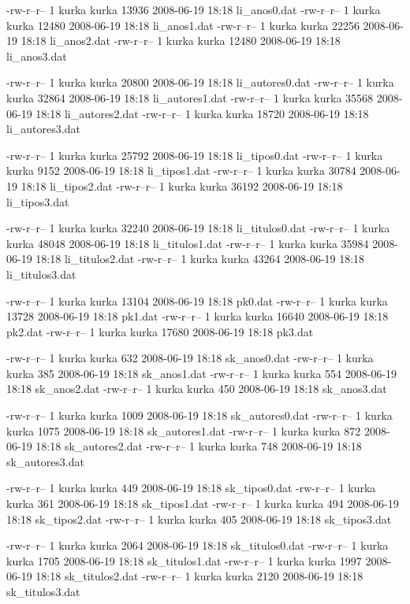 \documentclass{article}
\begin{document}
-rw-r--r-- 1 kurka kurka  13936 2008-06-19 18:18 li_anos0.dat
-rw-r--r-- 1 kurka kurka  12480 2008-06-19 18:18 li_anos1.dat
-rw-r--r-- 1 kurka kurka  22256 2008-06-19 18:18 li_anos2.dat
-rw-r--r-- 1 kurka kurka  12480 2008-06-19 18:18 li_anos3.dat

-rw-r--r-- 1 kurka kurka  20800 2008-06-19 18:18 li_autores0.dat
-rw-r--r-- 1 kurka kurka  32864 2008-06-19 18:18 li_autores1.dat
-rw-r--r-- 1 kurka kurka  35568 2008-06-19 18:18 li_autores2.dat
-rw-r--r-- 1 kurka kurka  18720 2008-06-19 18:18 li_autores3.dat

-rw-r--r-- 1 kurka kurka  25792 2008-06-19 18:18 li_tipos0.dat
-rw-r--r-- 1 kurka kurka   9152 2008-06-19 18:18 li_tipos1.dat
-rw-r--r-- 1 kurka kurka  30784 2008-06-19 18:18 li_tipos2.dat
-rw-r--r-- 1 kurka kurka  36192 2008-06-19 18:18 li_tipos3.dat

-rw-r--r-- 1 kurka kurka  32240 2008-06-19 18:18 li_titulos0.dat
-rw-r--r-- 1 kurka kurka  48048 2008-06-19 18:18 li_titulos1.dat
-rw-r--r-- 1 kurka kurka  35984 2008-06-19 18:18 li_titulos2.dat
-rw-r--r-- 1 kurka kurka  43264 2008-06-19 18:18 li_titulos3.dat

-rw-r--r-- 1 kurka kurka  13104 2008-06-19 18:18 pk0.dat
-rw-r--r-- 1 kurka kurka  13728 2008-06-19 18:18 pk1.dat
-rw-r--r-- 1 kurka kurka  16640 2008-06-19 18:18 pk2.dat
-rw-r--r-- 1 kurka kurka  17680 2008-06-19 18:18 pk3.dat

-rw-r--r-- 1 kurka kurka    632 2008-06-19 18:18 sk_anos0.dat
-rw-r--r-- 1 kurka kurka    385 2008-06-19 18:18 sk_anos1.dat
-rw-r--r-- 1 kurka kurka    554 2008-06-19 18:18 sk_anos2.dat
-rw-r--r-- 1 kurka kurka    450 2008-06-19 18:18 sk_anos3.dat

-rw-r--r-- 1 kurka kurka   1009 2008-06-19 18:18 sk_autores0.dat
-rw-r--r-- 1 kurka kurka   1075 2008-06-19 18:18 sk_autores1.dat
-rw-r--r-- 1 kurka kurka    872 2008-06-19 18:18 sk_autores2.dat
-rw-r--r-- 1 kurka kurka    748 2008-06-19 18:18 sk_autores3.dat

-rw-r--r-- 1 kurka kurka    449 2008-06-19 18:18 sk_tipos0.dat
-rw-r--r-- 1 kurka kurka    361 2008-06-19 18:18 sk_tipos1.dat
-rw-r--r-- 1 kurka kurka    494 2008-06-19 18:18 sk_tipos2.dat
-rw-r--r-- 1 kurka kurka    405 2008-06-19 18:18 sk_tipos3.dat

-rw-r--r-- 1 kurka kurka   2064 2008-06-19 18:18 sk_titulos0.dat
-rw-r--r-- 1 kurka kurka   1705 2008-06-19 18:18 sk_titulos1.dat
-rw-r--r-- 1 kurka kurka   1997 2008-06-19 18:18 sk_titulos2.dat
-rw-r--r-- 1 kurka kurka   2120 2008-06-19 18:18 sk_titulos3.dat
\end{document}
